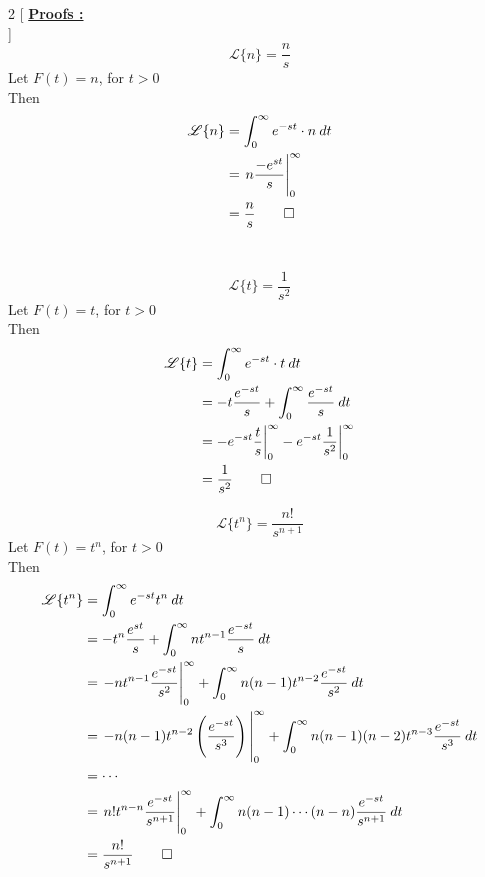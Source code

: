 \documentclass[12pt]{article}
\newcommand{\Lap}{\mathscr{L}}
\begin{document}
\begin{multicols}{2}
    [
    \underline{\textbf{Proofs :}}\\
    ]
    \[ \Lap \{ n \} = \frac{n}{s} \]
    Let $F(t) = n$, for $t>0$\\
    Then\\
    \begin{align*}
        \Lap \{ n \} &= \int_{0}^{\infty} { e^{-st} \cdot n } \: d{t} \\
                     &= \eval{ n\frac{-e^{st}}{s} }_{0}^{\infty} \\
                     &= \frac{n}{s}\qed
    \end{align*}\\
    \columnbreak

    \[ \Lap \{ t \} = \frac{1}{s^2} \]
    Let $F(t) = t$, for $t>0$\\
    Then\\
    \begin{align*}
        \Lap \{ t \} &= \int_{0}^{\infty} { e^{-st} \cdot t } \: d{t} \\
                     &= -t \frac{e^{-st}}{s} + \int_{0}^{\infty} {\frac{e^{-st}}{s}} \: d{t} \\
                     &= -e^{-st}\frac{t}{s}\bigg|_{0}^{\infty} - e^{-st}\frac{1}{s^2}\bigg|_{0}^{\infty} \\
                     &= \frac{1}{s^2}\qed
    \end{align*}
\end{multicols}

\[ \Lap \{ t^n \} = \frac{n!}{s^{n+1}} \]
Let $F(t) = t^{n}$, for $t>0$ \\
Then\\
\begin{align*}
    \Lap \{ t^{n} \} &= \int_{0}^{\infty} {e^{-s t}t^n} \: d{t} \\
                     &= -t^n \frac{e^{s t}}{s} + \int_{0}^{\infty} { nt^{n-1} \frac{e^{-s t}}{s} } \: d{t} \\
                     &= \eval{ -nt^{n-1} \frac{e^{-s t}}{s^2} }_{0}^{\infty} + \int_{0}^{\infty} { n(n-1)t^{n-2} \frac{e^{-s t}}{s^2} } \: d{t} \\
                     &= \eval{ -n(n-1)t^{n-2} \left( \frac{e^{-s t}}{s^3} \right) }_{0}^{\infty} + \int_{0}^{\infty} { n(n-1)(n-2)t^{n-3} \frac{e^{-s t}}{s^3} } \: d{t}  \\
                     &= \cdots \\
                     &= \eval{n!t^{n-n}\frac{e^{-s t}}{s^{n+1}}}_{0}^{\infty} + \int_{0}^{\infty} { n(n-1)\cdots(n-n) \frac{e^{-s t}}{s^{n+1}} } \: d{t} \\
                     &= \frac{n!}{s^{n+1}}\qed
\end{align*}\\~\\
\end{document}
